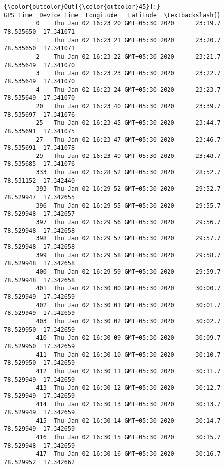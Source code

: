 \documentclass[11pt]{article}
\begin{document}
\begin{Verbatim}[commandchars=\\\{\}]
{\color{outcolor}Out[{\color{outcolor}45}]:}                                GPS Time  Device Time  Longitude   Latitude  \textbackslash{}
         0    Thu Jan 02 16:23:20 GMT+05:30 2020      23:19.7  78.535650  17.341071   
         1    Thu Jan 02 16:23:21 GMT+05:30 2020      23:20.7  78.535650  17.341071   
         2    Thu Jan 02 16:23:22 GMT+05:30 2020      23:21.7  78.535649  17.341070   
         3    Thu Jan 02 16:23:23 GMT+05:30 2020      23:22.7  78.535649  17.341070   
         4    Thu Jan 02 16:23:24 GMT+05:30 2020      23:23.7  78.535649  17.341070   
         20   Thu Jan 02 16:23:40 GMT+05:30 2020      23:39.7  78.535697  17.341076   
         25   Thu Jan 02 16:23:45 GMT+05:30 2020      23:44.7  78.535691  17.341075   
         27   Thu Jan 02 16:23:47 GMT+05:30 2020      23:46.7  78.535691  17.341078   
         29   Thu Jan 02 16:23:49 GMT+05:30 2020      23:48.7  78.535685  17.341076   
         333  Thu Jan 02 16:28:52 GMT+05:30 2020      28:52.7  78.531152  17.342440   
         393  Thu Jan 02 16:29:52 GMT+05:30 2020      29:52.7  78.529947  17.342655   
         396  Thu Jan 02 16:29:55 GMT+05:30 2020      29:55.7  78.529948  17.342657   
         397  Thu Jan 02 16:29:56 GMT+05:30 2020      29:56.7  78.529948  17.342658   
         398  Thu Jan 02 16:29:57 GMT+05:30 2020      29:57.7  78.529948  17.342658   
         399  Thu Jan 02 16:29:58 GMT+05:30 2020      29:58.7  78.529948  17.342658   
         400  Thu Jan 02 16:29:59 GMT+05:30 2020      29:59.7  78.529948  17.342658   
         401  Thu Jan 02 16:30:00 GMT+05:30 2020      30:00.7  78.529949  17.342659   
         402  Thu Jan 02 16:30:01 GMT+05:30 2020      30:01.7  78.529949  17.342659   
         403  Thu Jan 02 16:30:02 GMT+05:30 2020      30:02.7  78.529950  17.342659   
         410  Thu Jan 02 16:30:09 GMT+05:30 2020      30:09.7  78.529950  17.342659   
         411  Thu Jan 02 16:30:10 GMT+05:30 2020      30:10.7  78.529950  17.342659   
         412  Thu Jan 02 16:30:11 GMT+05:30 2020      30:11.7  78.529949  17.342659   
         413  Thu Jan 02 16:30:12 GMT+05:30 2020      30:12.7  78.529949  17.342659   
         414  Thu Jan 02 16:30:13 GMT+05:30 2020      30:13.7  78.529949  17.342659   
         415  Thu Jan 02 16:30:14 GMT+05:30 2020      30:14.7  78.529949  17.342659   
         416  Thu Jan 02 16:30:15 GMT+05:30 2020      30:15.7  78.529948  17.342659   
         417  Thu Jan 02 16:30:16 GMT+05:30 2020      30:16.7  78.529952  17.342662   

\end{Verbatim}
\end{document}
